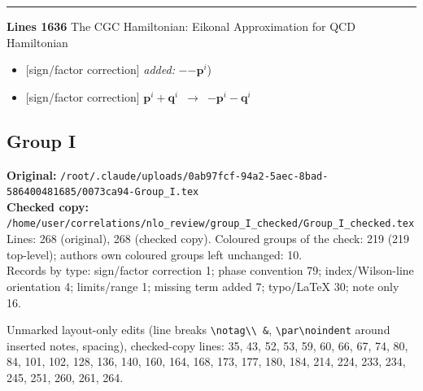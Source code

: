 \documentclass[10pt]{article}
\begin{document}
\noindent\rule{\linewidth}{0.3pt}\par\noindent\textbf{Lines 1636} \quad \textsf{The CGC Hamiltonian: Eikonal Approximation for QCD Hamiltonian} \par
\begin{itemize}[leftmargin=2.2em,itemsep=1pt,topsep=2pt]
\item[\textbf{l.1636}] \textsf{\small [sign/factor correction]} \emph{added:} $\displaystyle -$$\displaystyle -\mathbf{p}^{i}${\color{gray}\small)}
\item[\textbf{l.1636}] \textsf{\small [sign/factor correction]} $\displaystyle \mathbf{p}^{i}+\mathbf{q}^{i}$\ $\longrightarrow$\ $\displaystyle -\mathbf{p}^{i}-\mathbf{q}^{i}$
\end{itemize}
\bigskip
\subsection{Group I}\label{sec:file-group_I}
\noindent\textbf{Original:} \texttt{/root/.claude/uploads/0ab97fcf-94a2-5aec-8bad-586400481685/0073ca94-Group\_I.tex}\\\textbf{Checked copy:} \texttt{/home/user/correlations/nlo\_review/group\_I\_checked/Group\_I\_checked.tex}\\
Lines: 268 (original), 268 (checked copy). Coloured groups of the check: 219 (219 top-level); author\textquotesingle s own coloured groups left unchanged: 10.\\
Records by type: sign/factor correction 1; phase convention 79; index/Wilson-line orientation 4; limits/range 1; missing term added 7; typo/LaTeX 30; note only 16.
\par\noindent Unmarked layout-only edits (line breaks \texttt{\textbackslash notag\textbackslash\textbackslash\ \&}, \texttt{\textbackslash par\textbackslash noindent} around inserted notes, spacing), checked-copy lines: 35, 43, 52, 53, 59, 60, 66, 67, 74, 80, 84, 101, 102, 128, 136, 140, 160, 164, 168, 173, 177, 180, 184, 214, 224, 233, 234, 245, 251, 260, 261, 264.
\end{document}
